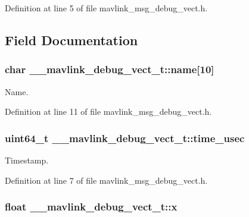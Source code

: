 Definition at line 5 of file mavlink\-\_\-msg\-\_\-debug\-\_\-vect.\-h.



\subsection{Field Documentation}
\hypertarget{struct____mavlink__debug__vect__t_a8547179b8e8db0e26704d23b474d5f0a}{
\subsubsection[{name}]{\setlength{\rightskip}{0pt plus 5cm}char \-\_\-\-\_\-mavlink\-\_\-debug\-\_\-vect\-\_\-t\-::name\mbox{[}10\mbox{]}}}\label{struct____mavlink__debug__vect__t_a8547179b8e8db0e26704d23b474d5f0a}


Name. 



Definition at line 11 of file mavlink\-\_\-msg\-\_\-debug\-\_\-vect.\-h.

\hypertarget{struct____mavlink__debug__vect__t_a8ce7a8e6e061bff40d49ca81fdd3ce33}{
\subsubsection[{time\-\_\-usec}]{\setlength{\rightskip}{0pt plus 5cm}uint64\-\_\-t \-\_\-\-\_\-mavlink\-\_\-debug\-\_\-vect\-\_\-t\-::time\-\_\-usec}}\label{struct____mavlink__debug__vect__t_a8ce7a8e6e061bff40d49ca81fdd3ce33}


Timestamp. 



Definition at line 7 of file mavlink\-\_\-msg\-\_\-debug\-\_\-vect.\-h.

\hypertarget{struct____mavlink__debug__vect__t_a9a222c84369ea74593be0625abb29bc8}{
\subsubsection[{x}]{\setlength{\rightskip}{0pt plus 5cm}float \-\_\-\-\_\-mavlink\-\_\-debug\-\_\-vect\-\_\-t\-::x}}\label{struct____mavlink__debug__vect__t_a9a222c84369ea74593be0625abb29bc8}


